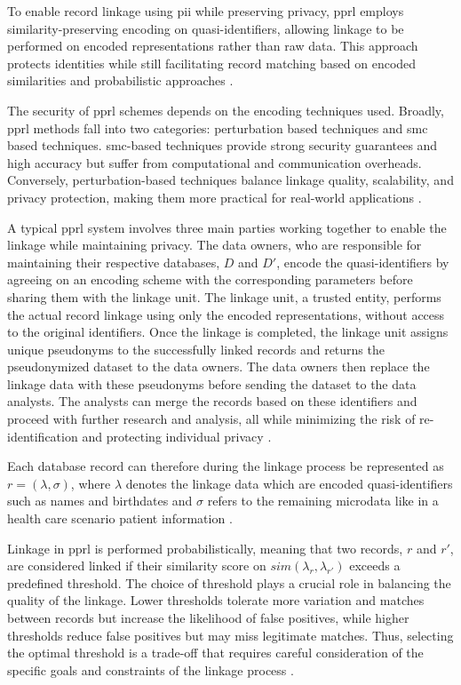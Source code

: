 To enable record linkage using \ac{pii} while preserving privacy, \ac{pprl} employs similarity-preserving encoding on quasi-identifiers, allowing linkage to be performed on encoded representations rather than raw data.
This approach protects identities while still facilitating record matching based on encoded similarities and probabilistic approaches \cite{schaefer2024,vidanage2020graph}.

The security of \ac{pprl} schemes depends on the encoding techniques used.
Broadly, \ac{pprl} methods fall into two categories: perturbation based techniques and \ac{smc} based techniques.
\ac{smc}-based techniques provide strong security guarantees and high accuracy but suffer from computational and communication overheads.
Conversely, perturbation-based techniques balance linkage quality, scalability, and privacy protection, making them more practical for real-world applications \cite{vidanage2020graph}.

A typical \ac{pprl} system involves three main parties working together to enable the linkage while maintaining privacy.
The data owners, who are responsible for maintaining their respective databases, \(D\) and \(D'\), encode the quasi-identifiers by agreeing on an encoding scheme with the corresponding parameters before sharing them with the linkage unit.
The linkage unit, a trusted entity, performs the actual record linkage using only the encoded representations, without access to the original identifiers.
Once the linkage is completed, the linkage unit assigns unique pseudonyms to the successfully linked records and returns the pseudonymized dataset to the data owners.
The data owners then replace the linkage data with these pseudonyms before sending the dataset to the data analysts.
The analysts can merge the records based on these identifiers and proceed with further research and analysis, all while minimizing the risk of re-identification and protecting individual privacy \cite{schaefer2024}.

Each database record can therefore during the linkage process be represented as $r = (\lambda,  \sigma)$, where $\lambda$ denotes the linkage data which are encoded quasi-identifiers such as names and birthdates and $\sigma$ refers to the remaining microdata like in a health care scenario patient information \cite{schaefer2024}.

Linkage in \ac{pprl} is performed probabilistically, meaning that two records, \(r\) and \(r'\), are considered linked if their similarity score on \(sim(\lambda_r, \lambda_{r'})\) exceeds a predefined threshold.
The choice of threshold plays a crucial role in balancing the quality of the linkage.
Lower thresholds tolerate more variation and matches between records but increase the likelihood of false positives, while higher thresholds reduce false positives but may miss legitimate matches.
Thus, selecting the optimal threshold is a trade-off that requires careful consideration of the specific goals and constraints of the linkage process \cite{schaefer2024}.

